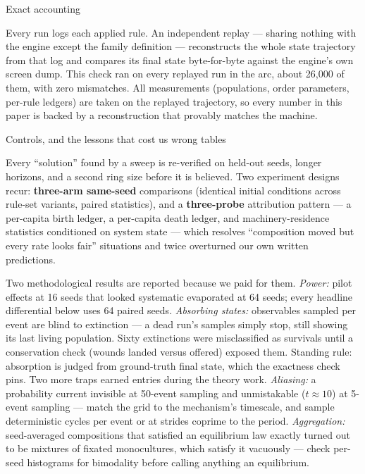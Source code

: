 \secc Exact accounting

Every run logs each applied rule. An independent replay ---
sharing nothing with the engine except the family definition ---
reconstructs the whole state trajectory from that log and compares
its final state byte-for-byte against the engine's own screen
dump. This check ran on every replayed run in the arc, about 26{,}000 of them, with zero mismatches. All measurements
(populations, order parameters, per-rule ledgers) are taken on the
replayed trajectory, so every number in this paper is backed by a
reconstruction that provably matches the machine.

\secc Controls, and the lessons that cost us wrong tables

Every “solution” found by a sweep is re-verified on held-out
seeds, longer horizons, and a second ring size before it is
believed. Two experiment designs recur: {\bf three-arm same-seed}
comparisons (identical initial conditions across rule-set variants,
paired statistics), and a {\bf three-probe} attribution pattern ---
a per-capita birth ledger, a per-capita death ledger, and
machinery-residence statistics conditioned on system state ---
which resolves “composition moved but every rate looks fair”
situations and twice overturned our own written predictions.

Two methodological results are reported because we paid for them.
{\it Power:} pilot effects at 16 seeds that looked systematic
evaporated at 64 seeds; every headline differential below uses 64
paired seeds. {\it Absorbing states:} observables sampled per event
are blind to extinction --- a dead run's samples simply stop, still
showing its last living population. Sixty extinctions were
misclassified as survivals until a conservation check (wounds
landed versus offered) exposed them. Standing rule: absorption is
judged from ground-truth final state, which the exactness check
pins. Two more traps earned entries during the theory work.
{\it Aliasing:} a probability current invisible at 50-event
sampling and unmistakable ($t\approx10$) at 5-event sampling ---
match the grid to the mechanism's timescale, and sample
deterministic cycles per event or at strides coprime to the
period. {\it Aggregation:} seed-averaged compositions that
satisfied an equilibrium law exactly turned out to be mixtures of
fixated monocultures, which satisfy it vacuously --- check
per-seed histograms for bimodality before calling anything an
equilibrium.


